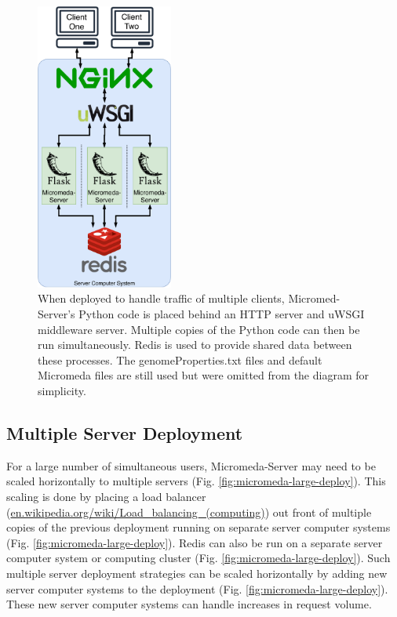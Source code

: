 \begin{figure}[!ht]
  \centering
	\includegraphics[width=0.40\textwidth]{media/micromeda-medium-deployment.pdf}
	 \caption{When deployed to handle traffic of multiple clients, Micromed-Server's Python code is placed behind an HTTP server and uWSGI middleware server. Multiple copies of the Python code can then be run simultaneously. Redis is used to provide shared data between these processes. The genomeProperties.txt files and default Micromeda files are still used but were omitted from the diagram for simplicity.}
	 \label{fig:micromeda-medium-deploy}
\end{figure}

\subsection{Multiple Server Deployment} \label{multi-server-micromeda-deployment}

For a large number of simultaneous users, Micromeda-Server may need to be scaled horizontally to multiple servers (Fig. \ref{fig:micromeda-large-deploy}). This scaling is done by placing a load balancer (\href{en.wikipedia.org/wiki/Load\_balancing\_(computing)}{en.wikipedia.org/wiki/Load\_balancing\_(computing)}) out front of multiple copies of the previous deployment running on separate server computer systems (Fig. \ref{fig:micromeda-large-deploy}). Redis can also be run on a separate server computer system or computing cluster (Fig. \ref{fig:micromeda-large-deploy}). Such multiple server deployment strategies can be scaled horizontally by adding new server computer systems to the deployment (Fig. \ref{fig:micromeda-large-deploy}). These new server computer systems can handle increases in request volume.

